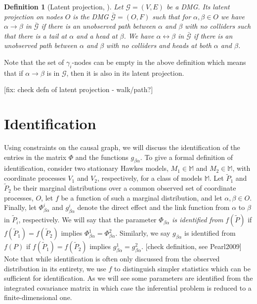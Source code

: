 \documentclass[accepted]{uai2021} %
\newtheorem{defn}[thm]{Definition}
\begin{document}
\begin{defn}[Latent projection, \cite{vermaEquiAndSynthesis,richardson2017}]
	\label{def:latProj}
	Let $\mathcal{G} = (V,E)$ be a DMG. Its latent projection on nodes $O$ is 
	the DMG $\bar{\mathcal{G}} = (O,F)$ such that for $\alpha,\beta\in O$ we 
	have $\alpha\rightarrow\beta$ in $\bar{\mathcal{G}}$ if there is an 
	unobserved path between $\alpha$ and $\beta$ with no colliders such that 
	there is a tail at $\alpha$ and a head at $\beta$. We have 
	$\alpha\leftrightarrow\beta$ in $\bar{\mathcal{G}}$ if there is an 
	unobserved path between $\alpha$ and $\beta$ with no colliders and heads at 
	both $\alpha$ and $\beta$.
\end{defn}

Note that the set of $\gamma_i$-nodes can be empty in the above definition 
which means that if $\alpha\rightarrow\beta$ is in $\mathcal{G}$, then it is 
also in its latent projection.

[fix: check defn of latent projection - walk/path?]



\section{Identification}

Using constraints on the causal graph, we will discuss the identification of 
the entries in the 
matrix $\Phi$ and the functions $g_{\beta\alpha}$. To give a formal definition 
of 
identification, consider two stationary Hawkes 
models, $M_1\in\mathbb{M}$ and $M_2\in\mathbb{M}$, with coordinate processes 
$V_1$ and $V_2$, 
respectively, for a class of models $\mathbb{M}$. Let $ \tilde{P}_1$ and $ 
\tilde{P}_2$ be their marginal 
distributions over a common observed set of 
coordinate processes, $O$, let $f$ be a function of 
such a marginal distribution, and let 
$\alpha,\beta\in O$. Finally, let $\Phi_{\beta\alpha}^i$ and 
$g_{\beta\alpha}^i$ 
denote the direct effect and the link function from $\alpha$ to 
$\beta$ in $\tilde{P}_i$, respectively. We will say that the parameter 
$\Phi_{\beta\alpha}$ \emph{is 
identified from} 
$f(\tilde{P})$ if $f(\tilde{P}_1) = f(\tilde{P}_2)$ 
implies $\Phi_{\beta\alpha}^1 = \Phi_{\beta\alpha}^2$. Similarly, we say 
$g_{\beta\alpha}$ is identified from $f(P)$ if $f(\tilde{P}_1) = 
f(\tilde{P}_2)$ 
implies $g_{\beta\alpha}^1 = g_{\beta\alpha}^2$. [check definition, see 
Pearl2009] Note that while identification is often only discussed from the 
observed distribution in its entirety, we use $f$ to distinguish simpler 
statistics which can be sufficient for identification. As we will see some 
parameters are identified from the integrated covariance matrix in which case 
the inferential problem is reduced to a finite-dimensional one.
\end{document}

